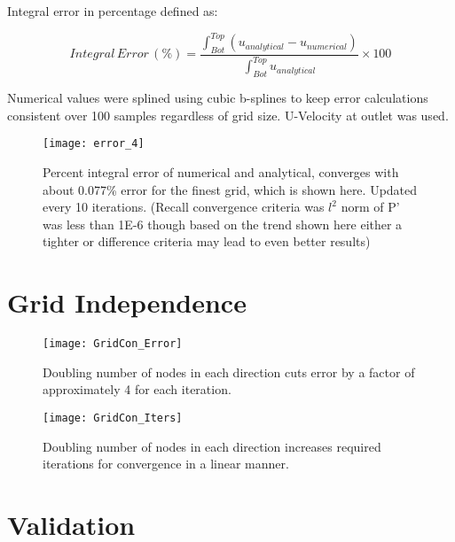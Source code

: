 \documentclass[10pt,english]{article}
\begin{document}
\noindent Integral error in percentage defined as:

    \begin{equation}
       Integral\,Error\,(\%) = \frac{\int_{Bot}^{Top}{(u_{analytical}-u_{numerical})}}{\int_{Bot}^{Top}{u_{analytical}}} \times 100
    \end{equation}

\noindent Numerical values were splined using cubic b-splines to keep error calculations consistent over 100 samples regardless of grid size.  U-Velocity at outlet was used.


\begin{figure}[H]
\centering
\texttt{[image: error\_4]}
\vspace{-5pt}
\caption{Percent integral error of numerical and analytical, converges with about 0.077\% error for the finest grid, which is shown here. Updated every 10 iterations. (Recall convergence criteria was $l^2$ norm of P' was less than 1E-6 though based on the trend shown here either a tighter or difference criteria may lead to even better results)}
\label{f:3b}
\end{figure}

\FloatBarrier
\vspace{5pt}
\section{Grid Independence}


\begin{figure}[H]
\centering
\texttt{[image: GridCon\_Error]}
\vspace{-5pt}
\caption{Doubling number of nodes in each direction cuts error by a factor of approximately 4 for each iteration.}
\label{f:3b}
\end{figure}


\begin{figure}[H]
\centering
\texttt{[image: GridCon\_Iters]}
\vspace{-5pt}
\caption{Doubling number of nodes in each direction increases required iterations for convergence in a linear manner.}
\label{f:3b}
\end{figure}

\section{Validation}
\end{document}
